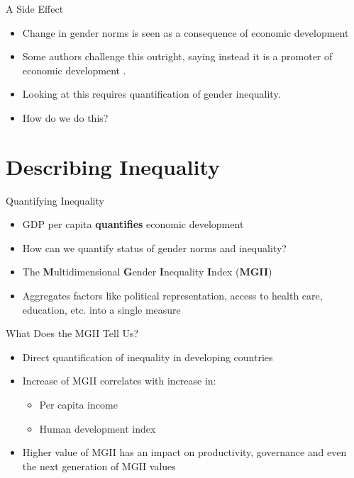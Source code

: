 \documentclass{beamer}
\begin{document}
\begin{frame}{A Side Effect}
  \begin{itemize}
  \item Change in gender norms is seen as a consequence of economic development
  \item Some authors challenge this outright, saying instead it is a promoter of economic development \cite{ferrant}.
  \item Looking at this requires quantification of gender inequality.
  \item How do we do this?
  \end{itemize}
\end{frame}

\section{Describing Inequality}
\begin{frame}{Quantifying Inequality}
  \begin{itemize}
  \item GDP per capita \textbf{quantifies} economic development
  \item How can we quantify status of gender norms and inequality?
  \item The \textbf{M}ultidimensional \textbf{G}ender \textbf{I}nequality \textbf{I}ndex (\textbf{MGII}) \cite{ferrant}
  \item Aggregates factors like political representation, access to health care, education, etc. into a single measure
  \end{itemize}
\end{frame}

\begin{frame}{What Does the MGII Tell Us?}
  \begin{itemize}
  \item Direct quantification of inequality in developing countries
  \item Increase of MGII correlates with increase in:
    \begin{itemize}
    \item Per capita income
    \item Human development index
    \end{itemize}
  \item Higher value of MGII has an impact on productivity, governance and even the next generation of MGII values
  \end{itemize}
\end{frame}
\end{document}
